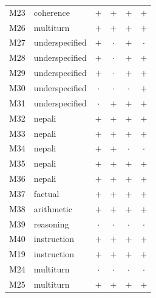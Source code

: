 \begin{longtable}{@{}llcccc@{}}
M23 & coherence & $+$ & $+$ & $+$ & $+$ \\
M26 & multiturn & $+$ & $+$ & $+$ & $+$ \\
M27 & underspecified & $+$ & $\cdot$ & $+$ & $\cdot$ \\
M28 & underspecified & $+$ & $\cdot$ & $+$ & $+$ \\
M29 & underspecified & $+$ & $\cdot$ & $+$ & $+$ \\
M30 & underspecified & $\cdot$ & $\cdot$ & $\cdot$ & $+$ \\
M31 & underspecified & $\cdot$ & $+$ & $+$ & $+$ \\
M32 & nepali & $+$ & $+$ & $+$ & $+$ \\
M33 & nepali & $+$ & $+$ & $+$ & $+$ \\
M34 & nepali & $+$ & $+$ & $\cdot$ & $\cdot$ \\
M35 & nepali & $+$ & $+$ & $+$ & $+$ \\
M36 & nepali & $+$ & $+$ & $+$ & $+$ \\
M37 & factual & $+$ & $+$ & $+$ & $+$ \\
M38 & arithmetic & $+$ & $+$ & $+$ & $+$ \\
M39 & reasoning & $\cdot$ & $\cdot$ & $\cdot$ & $\cdot$ \\
M40 & instruction & $+$ & $+$ & $+$ & $+$ \\
M19 & instruction & $+$ & $+$ & $+$ & $+$ \\
M24 & multiturn & $\cdot$ & $\cdot$ & $\cdot$ & $\cdot$ \\
M25 & multiturn & $+$ & $+$ & $+$ & $+$ \\
\end{longtable}
